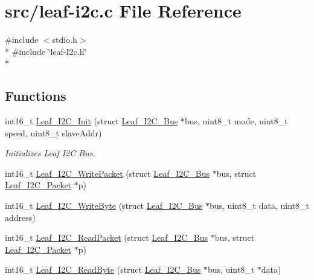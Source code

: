 \hypertarget{leaf-i2c_8c}{\section{src/leaf-\/i2c.c File Reference}
\label{leaf-i2c_8c}
}
{\ttfamily \#include $<$stdio.\-h$>$}\\*
{\ttfamily \#include \char`\"{}leaf-\/\-I2c.\-h\char`\"{}}\\*
\subsection*{Functions}
\begin{DoxyCompactItemize}
\item 
int16\-\_\-t \hyperlink{leaf-i2c_8c_a8baf85c610de76ab3ce759b088191f19}{Leaf\-\_\-\-I2\-C\-\_\-\-Init} (struct \hyperlink{structLeaf__I2C__Bus}{Leaf\-\_\-\-I2\-C\-\_\-\-Bus} $\ast$bus, uint8\-\_\-t mode, uint8\-\_\-t speed, uint8\-\_\-t slave\-Addr)
\begin{DoxyCompactList}\small\item\em Initializes Leaf I2\-C Bus. \end{DoxyCompactList}\item 
int16\-\_\-t \hyperlink{leaf-i2c_8c_a7c3cf399b26fb2d1545e8891a751ba32}{Leaf\-\_\-\-I2\-C\-\_\-\-Write\-Packet} (struct \hyperlink{structLeaf__I2C__Bus}{Leaf\-\_\-\-I2\-C\-\_\-\-Bus} $\ast$bus, struct \hyperlink{structLeaf__I2C__Packet}{Leaf\-\_\-\-I2\-C\-\_\-\-Packet} $\ast$p)
\item 
int16\-\_\-t \hyperlink{leaf-i2c_8c_a097ffc31e1b77c7630568f28e6121a0f}{Leaf\-\_\-\-I2\-C\-\_\-\-Write\-Byte} (struct \hyperlink{structLeaf__I2C__Bus}{Leaf\-\_\-\-I2\-C\-\_\-\-Bus} $\ast$bus, uint8\-\_\-t data, uint8\-\_\-t address)
\item 
int16\-\_\-t \hyperlink{leaf-i2c_8c_a377d1607018626036cff908e6d73fe75}{Leaf\-\_\-\-I2\-C\-\_\-\-Read\-Packet} (struct \hyperlink{structLeaf__I2C__Bus}{Leaf\-\_\-\-I2\-C\-\_\-\-Bus} $\ast$bus, struct \hyperlink{structLeaf__I2C__Packet}{Leaf\-\_\-\-I2\-C\-\_\-\-Packet} $\ast$p)
\item 
int16\-\_\-t \hyperlink{leaf-i2c_8c_a1821cafd3bb87041dc6cfe125841a2a8}{Leaf\-\_\-\-I2\-C\-\_\-\-Read\-Byte} (struct \hyperlink{structLeaf__I2C__Bus}{Leaf\-\_\-\-I2\-C\-\_\-\-Bus} $\ast$bus, uint8\-\_\-t $\ast$data)
\end{DoxyCompactItemize}


